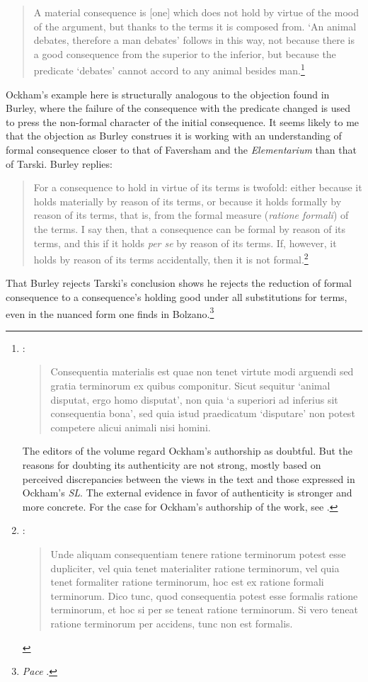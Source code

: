 \documentclass[]{birkjour}
\begin{document}
\begin{quote}
	A material consequence is [one] which does not hold by virtue of the mood of the argument, but thanks to the terms it is composed from. `An animal debates, therefore a man debates' follows in this way, not because there is a good consequence from the superior to the inferior, but because the predicate `debates' cannot accord to any animal besides man.\footnote{\autocite[VI. 4, p. 163]{OckhamEL}: \begin{quote}
			Consequentia materialis est quae non tenet virtute modi arguendi sed gratia terminorum ex quibus componitur. Sicut sequitur `animal disputat, ergo homo disputat', non quia `a superiori ad inferius sit consequentia bona', sed quia istud praedicatum `disputare' non potest competere alicui animali nisi homini.
		\end{quote} The editors of the volume regard Ockham's authorship as doubtful. But the reasons for doubting its authenticity are not strong, mostly based on perceived discrepancies between the views in the text and those expressed in Ockham's \textit{SL}. The external evidence in favor of authenticity is stronger and more concrete. For the case for Ockham's authorship of the work, see \autocite{Boehner1958b}.}
\end{quote}

Ockham's example here is structurally analogous to the objection found in Burley, where the failure of the consequence with the predicate changed is used to press the non-formal character of the initial consequence. It seems likely to me that the objection as Burley construes it is working with an understanding of formal consequence closer to that of Faversham and the \textit{Elementarium} than that of Tarski. Burley replies:
\begin{quote}
	For a consequence to hold in virtue of its terms is twofold: either because it holds materially by reason of its terms, or because it holds formally by reason of its terms, that is, from the formal measure (\textit{ratione formali}) of the terms. I say then, that a consequence can be formal by reason of its terms, and this if it holds \textit{per se} by reason of its terms. If, however, it holds by reason of its terms accidentally, then it is not formal.\footnote{\autocite[86.15-21]{BurleyDPAL}: 
		\begin{quote}
			Unde aliquam consequentiam tenere ratione terminorum potest esse dupliciter, vel quia tenet materialiter ratione terminorum, vel quia tenet formaliter ratione terminorum, hoc est ex ratione formali terminorum. Dico tunc, quod consequentia potest esse formalis ratione terminorum, et hoc si per se teneat ratione terminorum. Si vero teneat ratione terminorum per accidens, tunc non est formalis.
		\end{quote}}
\end{quote}
That Burley rejects Tarski's conclusion shows he rejects the reduction of formal consequence to a consequence's holding good under all substitutions for terms, even in the nuanced form one finds in Bolzano.\footnote{\textit{Pace} \autocite[pp. 83-84]{HodgesBurley}.}
\end{document}
